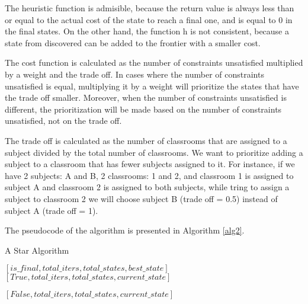 \documentclass[runningheads]{paper}
\begin{document}
The heuristic function is admisible, because the return value is always less than
or equal to the actual cost of the state to reach a final one, and is
equal to 0 in the final states. On the other hand, the function h is not consistent,
because a state from discovered can be added to the frontier with a smaller cost.

The cost function is calculated as the number of constraints unsatisfied multiplied
by a weight and the trade off. In cases where the number of constraints unsatisfied
is equal, multiplying it by a weight will prioritize the states that have the trade
off smaller. Moreover, when the number of constraints unsatisfied is different, the
prioritization will be made based on the number of constraints unsatisfied, not on
the trade off.

The trade off is calculated as the number of classrooms that are assigned to a
subject divided by the total number of classrooms. We want to prioritize adding
a subject to a classroom that has fewer subjects assigned to it. For instance,
if we have 2 subjects: A and B, 2 classrooms: 1 and 2, and classroom 1 is assigned
to subject A and classroom 2 is assigned to both subjects, while tring to assign
a subject to classroom 2 we will choose subject B (trade off = 0.5) instead of
subject A (trade off = 1).

The pseudocode of the algorithm is presented in Algorithm \ref{alg2}.

\begin{algorithm} 
\caption{A Star Algorithm}
\label{alg2}
\begin{algorithmic}[1]
 \Return $[is\_final, total\_iters, total\_states, best\_state] $
\Return $[True, total\_iters, total\_states, current\_state]$
\EndIf

\EndIf
\EndFor
\EndWhile
\State \Return $[False, total\_iters, total\_states, current\_state]$
\EndProcedure
\end{algorithmic}
\end{algorithm}
\end{document}
